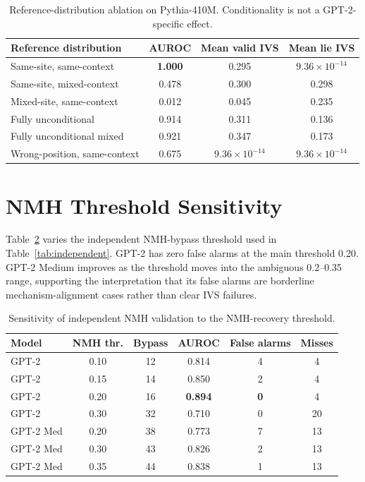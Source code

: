 \documentclass{article}
\begin{document}
\begin{table}[h]
\caption{Reference-distribution ablation on Pythia-410M. Conditionality is not a GPT-2-specific effect.}
\label{tab:conditionality_pythia410m}
\begin{center}\small
\begin{tabular}{lccc}
\toprule
\textbf{Reference distribution} & \textbf{AUROC} & \textbf{Mean valid IVS} & \textbf{Mean lie IVS} \\
\midrule
Same-site, same-context & \textbf{1.000} & 0.295 & $9.36{\times}10^{-14}$ \\
Same-site, mixed-context & 0.478 & 0.300 & 0.298 \\
Mixed-site, same-context & 0.012 & 0.045 & 0.235 \\
Fully unconditional & 0.914 & 0.311 & 0.136 \\
Fully unconditional mixed & 0.921 & 0.347 & 0.173 \\
Wrong-position, same-context & 0.675 & $9.36{\times}10^{-14}$ & $9.36{\times}10^{-14}$ \\
\bottomrule
\end{tabular}
\end{center}
\end{table}

\section{NMH Threshold Sensitivity}
\label{app:nmh_threshold}

Table~\ref{tab:nmh_threshold} varies the independent NMH-bypass threshold used in Table~\ref{tab:independent}. GPT-2 has zero false alarms at the main threshold 0.20. GPT-2 Medium improves as the threshold moves into the ambiguous 0.2--0.35 range, supporting the interpretation that its false alarms are borderline mechanism-alignment cases rather than clear IVS failures.

\begin{table}[h]
\caption{Sensitivity of independent NMH validation to the NMH-recovery threshold.}
\label{tab:nmh_threshold}
\begin{center}\small
\begin{tabular}{lccccc}
\toprule
\textbf{Model} & \textbf{NMH thr.} & \textbf{Bypass} & \textbf{AUROC} & \textbf{False alarms} & \textbf{Misses} \\
\midrule
GPT-2 & 0.10 & 12 & 0.814 & 4 & 4 \\
GPT-2 & 0.15 & 14 & 0.850 & 2 & 4 \\
GPT-2 & 0.20 & 16 & \textbf{0.894} & \textbf{0} & 4 \\
GPT-2 & 0.30 & 32 & 0.710 & 0 & 20 \\
GPT-2 Med & 0.20 & 38 & 0.773 & 7 & 13 \\
GPT-2 Med & 0.30 & 43 & 0.826 & 2 & 13 \\
GPT-2 Med & 0.35 & 44 & 0.838 & 1 & 13 \\
\bottomrule
\end{tabular}
\end{center}
\end{table}
\end{document}
